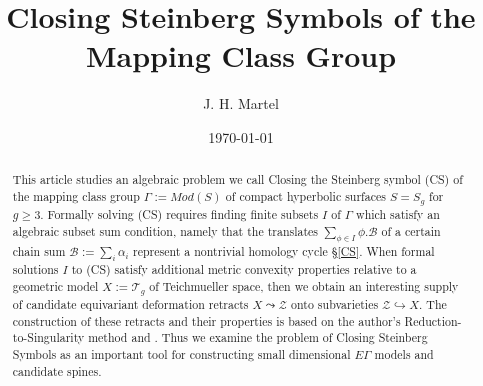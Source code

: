 \documentclass[12pt]{amsart}
\theoremstyle{definition}
\theoremstyle{remark}
\newcommand{\sB}{\mathscr{B}}
\newcommand{\sT}{\mathscr{T}}
\newcommand{\sZ}{\mathscr{Z}}
\begin{document}
\title{Closing Steinberg Symbols of the Mapping Class Group}
\author{J. H. Martel}
\date{\today}
\maketitle

\begin{abstract}
This article studies an algebraic problem we call Closing the Steinberg symbol (CS) of the mapping class group $\Gamma:=Mod(S)$ of compact hyperbolic surfaces $S=S_g$ for $g\geq 3$. Formally solving (CS) requires finding finite subsets $I$ of $\Gamma$ which satisfy an algebraic subset sum condition, namely that the translates $\sum_{\phi \in I}\phi.\sB$ of a certain chain sum $\sB:=\sum_i \alpha_i$ represent a nontrivial homology cycle \S\ref{CS}. When formal solutions $I$ to (CS) satisfy additional metric convexity properties relative to a geometric model $X:=\sT_g$ of Teichmueller space, then we obtain an interesting supply of candidate equivariant deformation retracts $X \leadsto \sZ$ onto subvarieties $\sZ \hookrightarrow X$. The construction of these retracts and their properties is based on the author's Reduction-to-Singularity method \cite{martel} and \cite{martel2022}. Thus we examine the problem of Closing Steinberg Symbols as an important tool for constructing small dimensional $E\Gamma$ models and candidate spines. 
\end{abstract}


\tableofcontents





\end{document}

